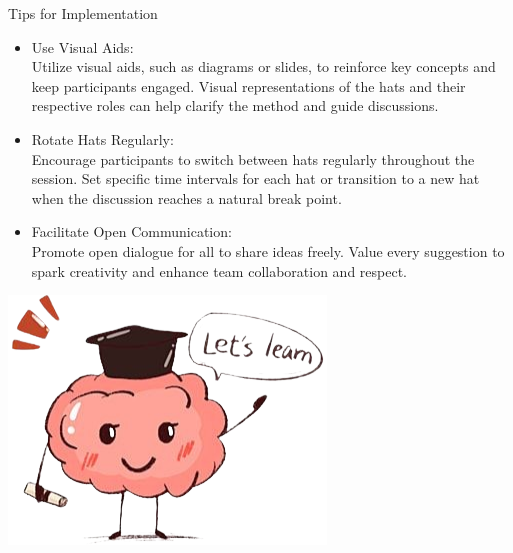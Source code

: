 \documentclass{beamer}
\begin{document}
\begin{frame}[fragile]
\begin{columns}[T]
\begin{column}{.3\textwidth}
\begin{block}{Tips for Implementation}
\begin{itemize}
\item \textcolor{mycolor}{Use Visual Aids:}\\
  \hspace*{1em}Utilize visual aids, such as diagrams or slides, to reinforce key concepts and keep participants engaged. Visual representations of the hats and their respective roles can help clarify the method and guide discussions.
\item \textcolor{mycolor}{Rotate Hats Regularly:} \\
  \hspace*{1em} Encourage participants to switch between hats regularly throughout the session. Set specific time intervals for each hat or transition to a new hat when the discussion reaches a natural break point.
\item \textcolor{mycolor}{Facilitate Open Communication:} \\
  \hspace*{1em}Promote open dialogue for all to share ideas freely. Value every suggestion to spark creativity and enhance team collaboration and respect.
\end{itemize}

\includegraphics[width=.6\linewidth]{let_s_learn.png}
\end{block}
\end{column}


\end{columns}




\end{frame}
\end{document}

